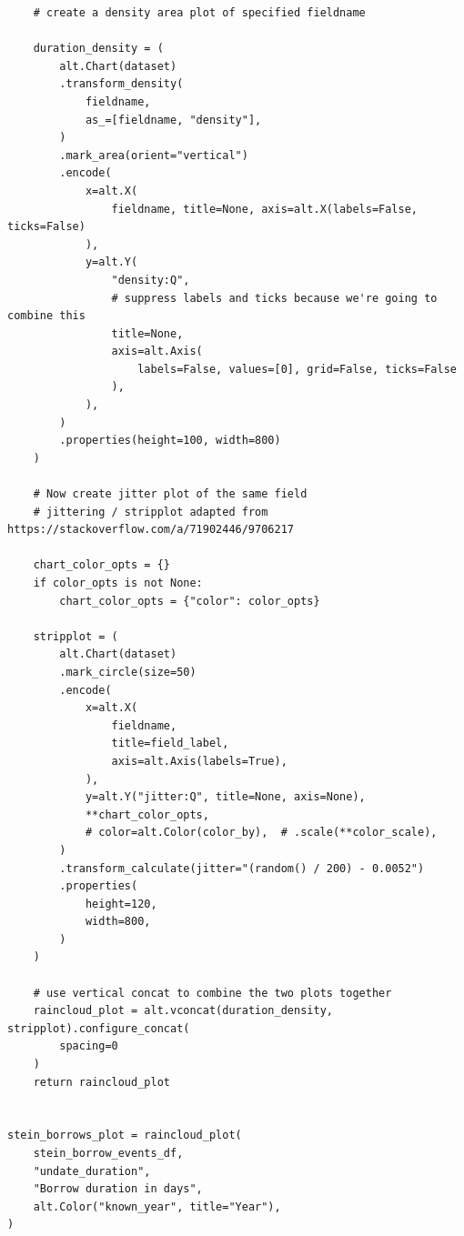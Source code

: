 \documentclass{anthology-ch}         %
\begin{document}
\begin{verbatim}
    # create a density area plot of specified fieldname

    duration_density = (
        alt.Chart(dataset)
        .transform_density(
            fieldname,
            as_=[fieldname, "density"],
        )
        .mark_area(orient="vertical")
        .encode(
            x=alt.X(
                fieldname, title=None, axis=alt.X(labels=False, ticks=False)
            ),
            y=alt.Y(
                "density:Q",
                # suppress labels and ticks because we're going to combine this
                title=None,
                axis=alt.Axis(
                    labels=False, values=[0], grid=False, ticks=False
                ),
            ),
        )
        .properties(height=100, width=800)
    )

    # Now create jitter plot of the same field
    # jittering / stripplot adapted from https://stackoverflow.com/a/71902446/9706217

    chart_color_opts = {}
    if color_opts is not None:
        chart_color_opts = {"color": color_opts}

    stripplot = (
        alt.Chart(dataset)
        .mark_circle(size=50)
        .encode(
            x=alt.X(
                fieldname,
                title=field_label,
                axis=alt.Axis(labels=True),
            ),
            y=alt.Y("jitter:Q", title=None, axis=None),
            **chart_color_opts,
            # color=alt.Color(color_by),  # .scale(**color_scale),
        )
        .transform_calculate(jitter="(random() / 200) - 0.0052")
        .properties(
            height=120,
            width=800,
        )
    )

    # use vertical concat to combine the two plots together
    raincloud_plot = alt.vconcat(duration_density, stripplot).configure_concat(
        spacing=0
    )
    return raincloud_plot


stein_borrows_plot = raincloud_plot(
    stein_borrow_events_df,
    "undate_duration",
    "Borrow duration in days",
    alt.Color("known_year", title="Year"),
)

\end{verbatim}
\end{document}

